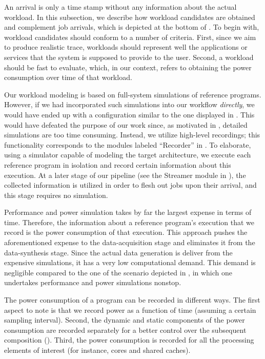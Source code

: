 An arrival is only a time stamp without any information about the actual
workload. In this subsection, we describe how workload candidates are obtained
and complement job arrivals, which is depicted at the bottom of
. To begin with, workload candidates should conform to a
number of criteria. First, since we aim to produce realistic trace, workloads
should represent well the applications or services that the system is supposed
to provide to the user. Second, a workload should be fast to evaluate, which, in
our context, refers to obtaining the power consumption over time of that
workload.

Our workload modeling is based on full-system simulations of reference programs.
However, if we had incorporated such simulations into our workflow
\emph{directly}, we would have ended up with a configuration similar to the one
displayed in . This would have defeated the purpose of our
work since, as motivated in , detailed simulations are too
time consuming. Instead, we utilize high-level recordings; this functionality
corresponds to the modules labeled ``Recorder'' in . To
elaborate, using a simulator capable of modeling the target architecture, we
execute each reference program in isolation and record certain information about
this execution. At a later stage of our pipeline (see the Streamer module in
), the collected information is utilized in order to flesh out
jobs upon their arrival, and this stage requires no simulation.

Performance and power simulation takes by far the largest expense in terms of
time. Therefore, the information about a reference program's execution that we
record is the power consumption of that execution. This approach pushes the
aforementioned expense to the data-acquisition stage and eliminates it from the
data-synthesis stage. Since the actual data generation is deliver from the
expensive simulations, it has a very low computational demand. This demand is
negligible compared to the one of the scenario depicted in ,
in which one undertakes performance and power simulations nonstop.

The power consumption of a program can be recorded in different ways. The first
aspect to note is that we record power as a function of time (assuming a certain
sampling interval). Second, the dynamic and static components of the power
consumption are recorded separately for a better control over the subsequent
composition (). Third, the power consumption is recorded for
all the processing elements of interest (for instance, cores and shared caches).


